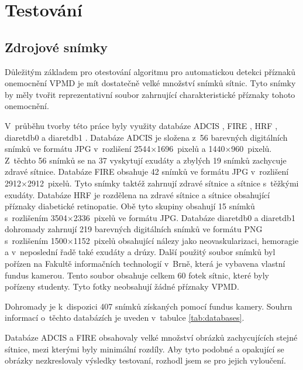 \chapter{Testování}
\label{ch:testovani}

\section{Zdrojové snímky}
Důležitým základem pro otestování algoritmu pro automatickou detekci příznaků onemocnění VPMD je mít dostatečně velké množství snímků sítnic. Tyto snímky by měly tvořit reprezentativní soubor zahrnující charakteristické příznaky tohoto onemocnění.

V~průběhu tvorby této práce byly využity databáze ADCIS \cite{db_adcis}, FIRE \cite{db_fire}, HRF \cite{db_hrf}, diaretdb0 \cite{db_diaret0} a diaretdb1 \cite{db_diaret1}. Databáze ADCIS je složena z~56 barevných digitálních snímků ve formátu JPG v~rozlišení 2544$\times$1696~pixelů a 1440$\times$960~pixelů. Z~těchto 56 snímků se na 37 vyskytují exudáty a zbylých 19 snímků zachycuje zdravé sítnice. Databáze FIRE obsahuje 42 snímků ve formátu JPG v~rozlišení 2912$\times$2912~pixelů. Tyto snímky taktéž zahrnují zdravé sítnice a sítnice s~těžkými exudáty. Databáze HRF je rozdělena na zdravé sítnice a sítnice obsahující příznaky diabetické retinopatie. Obě tyto skupiny obsahují 15 snímků s~rozlišením 3504$\times$2336~pixelů ve formátu JPG. Databáze diaretdb0 a diaretdb1 dohromady zahrnují 219 barevných digitálních snímků ve formátu PNG s~rozlišením 1500$\times$1152~pixelů obsahující nálezy jako neovaskularizaci, hemoragie a v~neposlední řadě také exudáty a drúzy. Další použitý soubor snímků byl pořízen na Fakultě informačních technologií v~Brně, která je vybavena vlastní fundus kamerou. Tento soubor obsahuje celkem 60 fotek sítnic, které byly pořízeny studenty. Tyto fotky neobsahují žádné příznaky VPMD. 

Dohromady je k~dispozici 407 snímků získaných pomocí fundus kamery. Souhrn informací o~těchto databázích je uveden v~tabulce \ref{tab:databases}.

Databáze ADCIS a FIRE obsahovaly velké množství obrázků zachycujících stejné sítnice, mezi kterými byly minimální rozdíly. Aby tyto podobné a opakující se obrázky nezkreslovaly výsledky testovaní, rozhodl jsem se pro jejich vyloučení.

